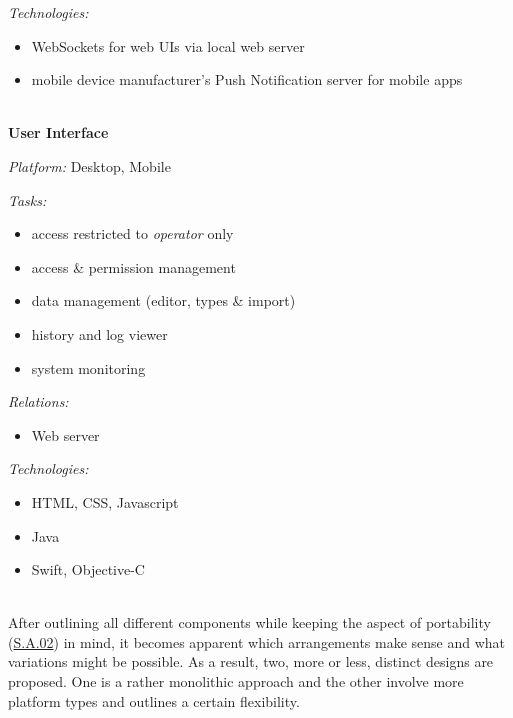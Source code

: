 \documentclass[12pt,english,a4paper,titlepage,cleardoublepage=empty,dottedtoc]{report}
\providecommand{\tightlist}{%
  \setlength{\itemsep}{0pt}\setlength{\parskip}{0pt}}
\begin{document}
\emph{Technologies:}

\begin{itemize}
\tightlist
\item
  WebSockets for web UIs via local web server
\item
  mobile device manufacturer's Push Notification server for mobile apps
\end{itemize}

~\\
\textbf{User Interface}

\emph{Platform:} Desktop, Mobile

\emph{Tasks:}

\begin{itemize}
\tightlist
\item
  access restricted to \emph{operator} only
\item
  access \& permission management
\item
  data management (editor, types \& import)
\item
  history and log viewer
\item
  system monitoring
\end{itemize}

\emph{Relations:}

\begin{itemize}
\tightlist
\item
  Web server
\end{itemize}

\emph{Technologies:}

\begin{itemize}
\tightlist
\item
  HTML, CSS, Javascript
\item
  Java
\item
  Swift, Objective-C
\end{itemize}

~\\
After outlining all different components while keeping the aspect of
portability (\protect\hyperlink{sa02}{S.A.02}) in mind, it becomes
apparent which arrangements make sense and what variations might be
possible. As a result, two, more or less, distinct designs are proposed.
One is a rather monolithic approach and the other involve more platform
types and outlines a certain flexibility.
\end{document}
